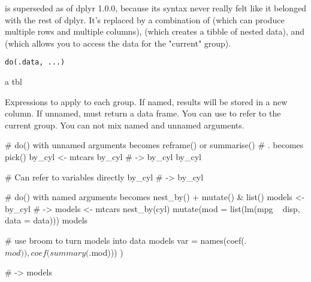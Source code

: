 \documentclass[a4paper]{book}
\begin{document}
%
\begin{Description}
\strong{[Superseded]}

 is superseded as of dplyr 1.0.0, because its syntax never really
felt like it belonged with the rest of dplyr. It's replaced by a combination
of  (which can produce multiple rows and multiple columns),
 (which creates a  tibble of nested data),
and  (which allows you to access the data for the "current" group).
\end{Description}
%
\begin{Usage}
\begin{verbatim}
do(.data, ...)
\end{verbatim}
\end{Usage}
%
\begin{Arguments}
\begin{ldescription}
\item[\code{.data}] a tbl

\item[\code{...}] Expressions to apply to each group. If named, results will be
stored in a new column. If unnamed, must return a data frame. You can
use  to refer to the current group. You can not mix named and
unnamed arguments.
\end{ldescription}
\end{Arguments}
%
\begin{Examples}
\begin{ExampleCode}
# do() with unnamed arguments becomes reframe() or summarise()
# . becomes pick()
by_cyl <- mtcars %
by_cyl %
# ->
by_cyl %
by_cyl %

# Can refer to variables directly
by_cyl %
# ->
by_cyl %

# do() with named arguments becomes nest_by() + mutate() & list()
models <- by_cyl %
# ->
models <- mtcars %
  nest_by(cyl) %
  mutate(mod = list(lm(mpg ~ disp, data = data)))
models %

# use broom to turn models into data
models %
  var = names(coef(.$mod)),
  coef(summary(.$mod)))
)

# ->
models %

\end{ExampleCode}
\end{Examples}
\end{document}
